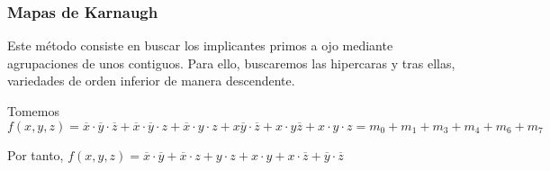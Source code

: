 \subsubsection{Mapas de Karnaugh}
Este método consiste en buscar los implicantes primos a ojo mediante agrupaciones de unos contiguos. Para ello, buscaremos las hipercaras y tras ellas, variedades de orden inferior de manera descendente.
\begin{ejemplo}
    Tomemos $f(x,y,z) =\overline{x} \cdot \overline{y} \cdot \overline{z}+\overline{x} \cdot \overline{y} \cdot z+\overline{x} \cdot y \cdot z+x\overline{y} \cdot \overline{z}+x \cdot y\overline{z}+x \cdot y \cdot z=m_0+m_1+m_3+m_4+m_6+m_7$
    \begin{center}
        \begin{Karnaugh_2x4}
        \end{Karnaugh_2x4}
    \end{center}
    Por tanto, $f(x,y,z) = \overline{x} \cdot \overline{y} + \overline{x} \cdot z + y \cdot z + x \cdot y + x \cdot \overline{z} + \overline{y} \cdot \overline{z}$
\end{ejemplo}

